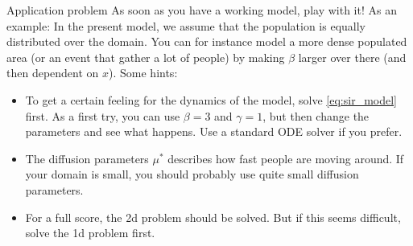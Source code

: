 \begin{railingbox}{Application problem}
  As soon as you have a working model, play with it! As an example: In the present model, we assume that the population is equally distributed over the domain. You can for instance model a more dense populated area (or an event that gather a lot of people) by making \(\beta\) larger over there (and then dependent on \(x\)).
  Some hints:
  \begin{itemize}
    \item To get a certain feeling for the dynamics of the model, solve \eqref{eq:sir_model} first. As a first try, you can use \(\beta = 3\) and \(\gamma = 1\), but then change the parameters and see what happens. Use a standard ODE solver if you prefer.
    \item The diffusion parameters \(\mu^*\) describes how fast people are moving around. If your domain is small, you should probably use quite small diffusion parameters.
    \item For a full score, the 2d problem should be solved. But if this seems difficult, solve the 1d problem first.
  \end{itemize}
\end{railingbox}




